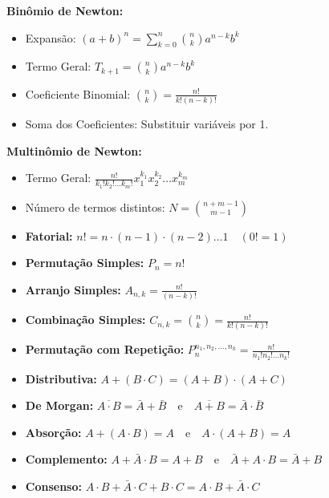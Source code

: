 \documentclass[a4paper,12pt]{article}
\begin{document}
\begin{tcolorbox}[colback=gray!5,colframe=black,title=Binômio e Multinômio de Newton,fonttitle=\bfseries]
    \textbf{Binômio de Newton:}
    \begin{itemize}
        \item Expansão: $(a+b)^n = \sum_{k=0}^n \binom{n}{k} a^{n-k} b^k$
        \item Termo Geral: $T_{k+1} = \binom{n}{k} a^{n-k} b^k$
        \item Coeficiente Binomial: $\binom{n}{k} = \frac{n!}{k!(n-k)!}$
        \item Soma dos Coeficientes: Substituir variáveis por 1.
    \end{itemize}
    \smallskip
    \textbf{Multinômio de Newton:}
    \begin{itemize}
        \item Termo Geral: $\frac{n!}{k_1! k_2! \dots k_m!} x_1^{k_1} x_2^{k_2} \dots x_m^{k_m}$
        \item Número de termos distintos: $N = \binom{n+m-1}{m-1}$
    \end{itemize}
\end{tcolorbox}

\begin{tcolorbox}[colback=gray!5,colframe=black,title=Análise Combinatória,fonttitle=\bfseries]
    \begin{itemize}[noitemsep]
        \item \textbf{Fatorial:} $n! = n \cdot (n-1) \cdot (n-2) \dots 1 \quad (0! = 1)$
        \item \textbf{Permutação Simples:} $P_n = n!$
        \item \textbf{Arranjo Simples:} $A_{n,k} = \frac{n!}{(n-k)!}$
        \item \textbf{Combinação Simples:} $C_{n,k} = \binom{n}{k} = \frac{n!}{k!(n-k)!}$
        \item \textbf{Permutação com Repetição:} $P_n^{n_1, n_2, \dots, n_k} = \frac{n!}{n_1! n_2! \dots n_k!}$
    \end{itemize}
\end{tcolorbox}

\begin{tcolorbox}[colback=gray!5,colframe=black,title=Propriedades da Álgebra Booleana,fonttitle=\bfseries]
    \begin{itemize}[noitemsep]
        \item \textbf{Distributiva:} $A + (B \cdot C) = (A + B) \cdot (A + C)$
        \item \textbf{De Morgan:} $\overline{A \cdot B} = \bar{A} + \bar{B} \quad \text{e} \quad \overline{A + B} = \bar{A} \cdot \bar{B}$
        \item \textbf{Absorção:} $A + (A \cdot B) = A \quad \text{e} \quad A \cdot (A + B) = A$
        \item \textbf{Complemento:} $A + \bar{A} \cdot B = A + B \quad \text{e} \quad \bar{A} + A \cdot B = \bar{A} + B$
        \item \textbf{Consenso:} $A \cdot B + \bar{A} \cdot C + B \cdot C = A \cdot B + \bar{A} \cdot C$
    \end{itemize}
\end{tcolorbox}
\end{document}
